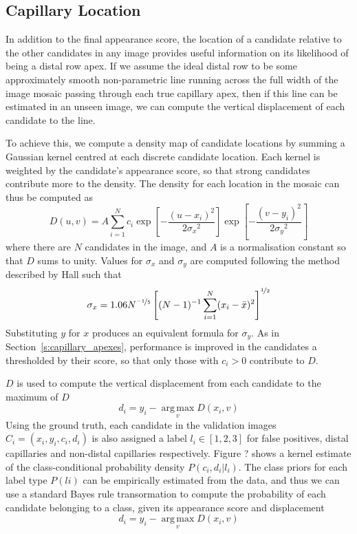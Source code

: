 \documentclass[runningheads,a4paper]{llncs}
\newcommand{\sref}[1]{Section~\ref{#1}}
\begin{document}
\subsection{Capillary Location}
\label{s:distal_location}
In addition to the final appearance score, the location of a candidate relative to the other candidates in any image provides useful information on its likelihood of being a distal row apex. If we assume the ideal distal row to be some approximately smooth non-parametric line running across the full width of the image mosaic passing through each true capillary apex, then if this line can be estimated in an unseen image, we can compute the vertical displacement of each candidate to the line.

To achieve this, we compute a density map of candidate locations by summing a Gaussian kernel centred at each discrete candidate location. Each kernel is weighted by the candidate's appearance score, so that strong candidates contribute more to the density. The density for each location in the mosaic can thus be computed as
%
\begin{equation}
D(u,v) = A\sum\limits_{i=1}^N c_i\exp \left[ -\frac{(u-x_i)^2}{2{\sigma_x}^2}\right]\exp \left[ -\frac{(v-y_i)^2}{2{\sigma_y}^2}\right]
\label{e:kernel_estimate}
\end{equation}
where there are $N$ candidates in the image, and $A$ is a normalisation constant so that $D$ sums to unity. Values for $\sigma_x$ and $\sigma_y$ are computed following the method described by Hall \cite{} such that
%
\begin{equation}
\sigma_x = 1.06N^{\nicefrac{-1}{5}} \left[ (N-1)^{-1} \sum\limits_{i=1}^N (x_i - \bar{x})^2 \right] ^{\nicefrac{1}{2}}
\label{e:kernel_sigma}
\end{equation}
%
Substituting $y$ for $x$ produces an equivalent formula for $\sigma_y$. As in \sref{s:capillary_apexes}, performance is improved in the candidates a thresholded by their score, so that only those with $c_i > 0$ contribute to $D$.

$D$ is used to compute the vertical displacement from each candidate to the maximum of $D$
%
\begin{equation}
d_i = y_i -  \operatorname*{arg\,max}_v D(x_i,v)
\label{e:candidate_displacment}
\end{equation}
%
Using the ground truth, each candidate in the validation images $C_i=(x_i,y_i,c_i,d_i)$ is also assigned a label $l_i \in [1,2,3]$ for false positives, distal capillaries and non-distal capillaries respectively. Figure ? shows a kernel estimate of the class-conditional probability density $P(c_i, d_i | l_i)$. The class priors for each label type $P(li)$ can be empirically estimated from the data, and thus we can use a standard Bayes rule transormation to compute the probability of each candidate belonging to a class, given its appearance score and displacement
%
\begin{equation}
d_i = y_i -  \operatorname*{arg\,max}_v D(x_i,v)
\label{e:candidate_displacment}
\end{equation}
%
\end{document}
